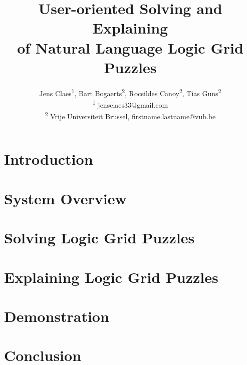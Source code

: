 \documentclass[letterpaper]{article} %
\title{User-oriented Solving and Explaining \\of Natural Language Logic Grid Puzzles}
\author{Jens Claes\textsuperscript{\rm 1}, Bart Bogaerts\textsuperscript{\rm 2}, Rocsildes Canoy\textsuperscript{\rm 2}, Tias Guns\textsuperscript{\rm 2} \\
\textsuperscript{\rm 1} jensclaes33@gmail.com\\
\textsuperscript{\rm 2} Vrije Universiteit Brussel, firstname.lastname@vub.be %
}
\begin{document}
 
 \newcommand\ourtool{\logicname{ZebraTutor}}

\maketitle

\begin{abstract}

\end{abstract}

\section{Introduction}




\section{System Overview}


%

\section{Solving Logic Grid Puzzles}\label{sec:solving}


\section{Explaining Logic Grid Puzzles}\label{sec:expl}


\section{Demonstration}\label{sec:demo}


\section{Conclusion}




\end{document}
